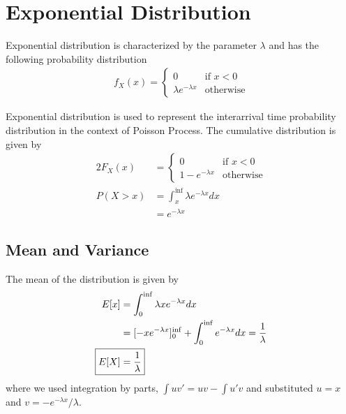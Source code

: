 \documentclass[../probability-notes.tex]{subfiles}
\begin{document}
    \section{Exponential Distribution}
    Exponential distribution is characterized by the parameter $\lambda$ and has the following probability distribution
    \begin{align*}
        f_{X}(x) = \begin{cases} 0 &\mbox{if $x < 0$}\\
                                \lambda e^{-\lambda x} &\mbox{otherwise} \end{cases}
    \end{align*}

    Exponential distribution is used to represent the interarrival time probability distribution in the context of Poisson Process. The cumulative distribution is given by
    \begin{alignat*}{2}
        F_{X}(x) &= \begin{cases} 0 &\mbox{if $x < 0$}\\
                                1 - e^{-\lambda x} &\mbox{otherwise} \end{cases}\\
        P(X > x) &= \int_{x}^{\inf} \lambda e^{-\lambda x} dx\\
        &= e^{-\lambda x}
    \end{alignat*}

    \subsection{Mean and Variance}
    The mean of the distribution is given by
    \begin{align*}
        E[x] &= \int_{0}^{\inf} \lambda x e^{-\lambda x} dx\\
        &= [-x e^{-\lambda x}]_{0}^{\inf} + \int_{0}^{\inf} e^{-\lambda x} dx = \frac{1}{\lambda}\\
        \Aboxed{E[X] &= \frac{1}{\lambda}}
    \end{align*}
    where we used integration by parts, $\int uv' = uv - \int u'v$ and substituted $u = x$ and $v = -e^{-\lambda x}/\lambda$.\newline
\end{document}
